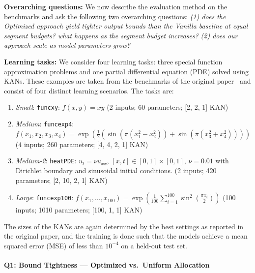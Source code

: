 \textbf{Overarching questions:}
We now describe the evaluation method on the benchmarks and ask the following two overarching questions: \emph{(1) does the Optimized approach yield tighter output bounds than the Vanilla baseline at equal segment budgets? what happens as the segment budget increases?} \emph{(2) does our approach scale as model parameters grow?}

\textbf{Learning tasks:} We consider four learning tasks: three special function approximation problems and one partial differential equation (PDE) solved using KANs. These examples are taken from the benchmarks of the original paper~\cite{Liu+Others/2025/KAN} and consist of four distinct learning scenarios. The tasks are:
\begin{enumerate}
    \item \emph{Small}: \texttt{funcxy}: $f(x, y) = x y$ (2 inputs; 60 parameters; [2, 2, 1] KAN)
    \item \emph{Medium}: \texttt{funcexp4}: $f(x_1, x_2, x_3, x_4) = \exp(\frac{1}{2}(\sin(\pi(x_1^2 - x_2^2)) + \sin(\pi(x_3^2 + x_4^2))))$ (4 inputs; 260 parameters; [4, 4, 2, 1] KAN)
    \item \emph{Medium-2}: \texttt{heatPDE}: $u_t = \nu u_{xx}$, $[x, t] \in [0,1] \times [0,1]$, $\nu = 0.01$ with Dirichlet boundary and sinusoidal initial conditions. (2 inputs; 420 parameters; [2, 10, 2, 1] KAN)
    \item \emph{Large}: \texttt{funcexp100}: $f(x_1,\dots,x_{100}) = \exp(\frac{1}{100}\sum_{i=1}^{100}\sin^2(\frac{\pi x_i}{2}))$ (100 inputs; 1010 parameters; [100, 1, 1] KAN)
\end{enumerate}
The sizes of the KANs are again determined by the best settings as reported in the original paper, and the training is done such that the models achieve a mean squared error (MSE) of less than $10^{-4}$ on a held-out test set.

\paragraph{\textbf{Q1: Bound Tightness --- Optimized vs.\ Uniform Allocation}}

